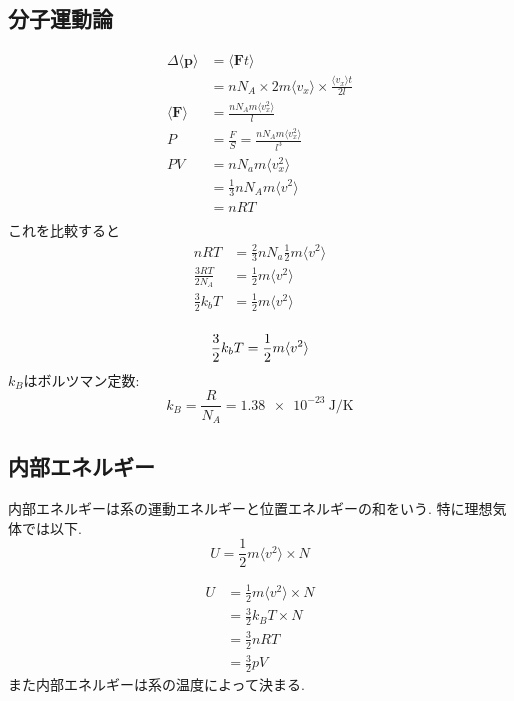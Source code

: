\documentclass[dvipdfmx,uplatex]{jsarticle}
\begin{document}
\subsection{分子運動論}
\begin{align*}
\Delta \langle \bm{p} \rangle &= \langle \bm{F} t \rangle \\
&= nN_A \times 2m \langle v_x \rangle \times \frac{\langle v_x\rangle t}{2l} \\
\langle \bm{F} \rangle &= \frac{nN_A m \langle v_x^2 \rangle}{l} \\
P &= \frac{F}{S} = \frac{nN_A m \langle v_x^2 \rangle}{l^3} \\
PV &= nN_a m \langle v_x^2 \rangle \\
&= \frac{1}{3} nN_A m \langle v^2 \rangle \\
&= nRT \\
\end{align*}
これを比較すると
\begin{align*}
nRT &= \frac{2}{3} nN_a \frac{1}{2} m \langle v^2 \rangle \\
\frac{3RT}{2N_A} &= \frac{1}{2} m \langle v^2 \rangle \\
\frac{3}{2}k_bT &= \frac{1}{2} m \langle v^2 \rangle\\
\end{align*}
\begin{defi}[温度Tの定義]
\[
 \frac{3}{2}k_bT = \frac{1}{2} m \langle v^2 \rangle\\
\]
$k_B$はボルツマン定数:
\[
k_B = \frac{R}{N_A} = \SI{1.38e-23}{\joule \per \kelvin}
\]
\end{defi}

\subsection{内部エネルギー}
\begin{defi}[内部エネルギー]
内部エネルギーは系の運動エネルギーと位置エネルギーの和をいう.
特に理想気体では以下.
\[
U = \frac{1}{2}m \langle v^2 \rangle \times N
\]
\end{defi}
\begin{align*}
U &= \frac{1}{2}m \langle v^2 \rangle \times N \\
&= \frac{3}{2}k_BT \times N \\
&= \frac{3}{2}nRT \\
&= \frac{3}{2}pV
\end{align*}
また内部エネルギーは系の温度によって決まる.
\end{document}
